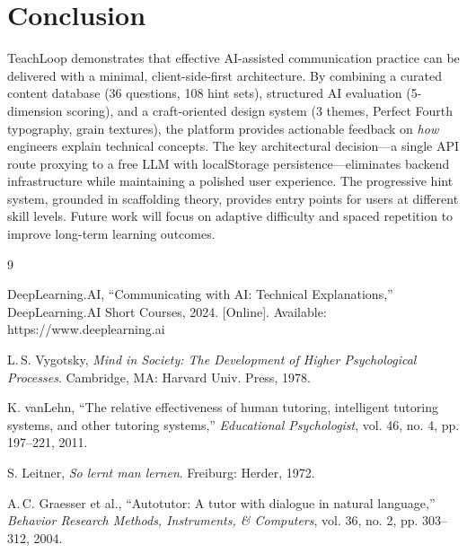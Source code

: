 \documentclass[11pt]{article}
\begin{document}
\section{Conclusion}
\label{sec:conclusion}

TeachLoop demonstrates that effective AI-assisted communication practice can be delivered with a minimal, client-side-first architecture. By combining a curated content database (36 questions, 108 hint sets), structured AI evaluation (5-dimension scoring), and a craft-oriented design system (3 themes, Perfect Fourth typography, grain textures), the platform provides actionable feedback on \emph{how} engineers explain technical concepts. The key architectural decision---a single API route proxying to a free LLM with localStorage persistence---eliminates backend infrastructure while maintaining a polished user experience. The progressive hint system, grounded in scaffolding theory, provides entry points for users at different skill levels. Future work will focus on adaptive difficulty and spaced repetition to improve long-term learning outcomes.

\begin{thebibliography}{9}

DeepLearning.AI, ``Communicating with AI: Technical Explanations,'' DeepLearning.AI Short Courses, 2024. [Online]. Available: https://www.deeplearning.ai

L.\,S. Vygotsky, \emph{Mind in Society: The Development of Higher Psychological Processes}. Cambridge, MA: Harvard Univ. Press, 1978.

K. vanLehn, ``The relative effectiveness of human tutoring, intelligent tutoring systems, and other tutoring systems,'' \emph{Educational Psychologist}, vol. 46, no. 4, pp. 197--221, 2011.

S. Leitner, \emph{So lernt man lernen}. Freiburg: Herder, 1972.

A.\,C. Graesser et al., ``Autotutor: A tutor with dialogue in natural language,'' \emph{Behavior Research Methods, Instruments, \& Computers}, vol. 36, no. 2, pp. 303--312, 2004.

\end{thebibliography}
\end{document}
